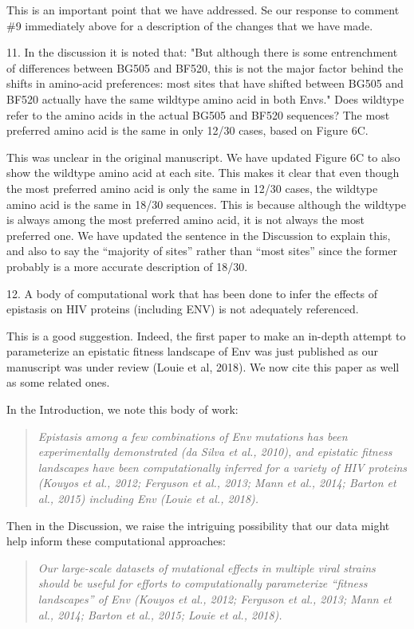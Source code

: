 \documentclass[11pt, oneside]{article}   	%
\begin{document}
{\color{black}
This is an important point that we have addressed.
Se our response to comment \#9 immediately above for a description of the changes that we have made.}

11. In the discussion it is noted that: "But although there is some entrenchment of differences between BG505 and BF520, this is not the major factor behind the shifts in amino-acid preferences: most sites that have shifted between BG505 and BF520 actually have the same wildtype amino acid in both Envs." Does wildtype refer to the amino acids in the actual BG505 and BF520 sequences? The most preferred amino acid is the same in only 12/30 cases, based on Figure 6C. 

{\color{black}
This was unclear in the original manuscript.
We have updated Figure 6C to also show the wildtype amino acid at each site.
This makes it clear that even though the most preferred amino acid is only the same in 12/30 cases, the wildtype amino acid is the same in 18/30 sequences.
This is because although the wildtype is always among the most preferred amino acid, it is not always the most preferred one.
We have updated the sentence in the Discussion to explain this, and also to say the ``majority of sites'' rather than ``most sites'' since the former probably is a more accurate description of 18/30.}

12. A body of computational work that has been done to infer the effects of epistasis on HIV proteins (including ENV) is not adequately referenced. 

{\color{black}
This is a good suggestion. 
Indeed, the first paper to make an in-depth attempt to parameterize an epistatic fitness landscape of Env was just published as our manuscript was under review (Louie et al, 2018).
We now cite this paper as well as some related ones.

In the Introduction, we note this body of work:
\begin{quote}
\textsl{
Epistasis among a few combinations of Env mutations has been experimentally demonstrated (da Silva et al., 2010), and epistatic fitness landscapes have been computationally inferred for a variety of HIV proteins (Kouyos et al., 2012; Ferguson et al., 2013; Mann et al., 2014; Barton et al., 2015) including Env (Louie et al., 2018).
}
\end{quote}

Then in the Discussion, we raise the intriguing possibility that our data might help inform these computational approaches:
\begin{quote}
\textsl{Our large-scale datasets of mutational effects in multiple viral strains should be useful for efforts to computationally parameterize ``fitness landscapes'' of Env (Kouyos et al., 2012; Ferguson et al., 2013; Mann et al., 2014; Barton et al., 2015; Louie et al., 2018).}
\end{quote}}
\end{document}
